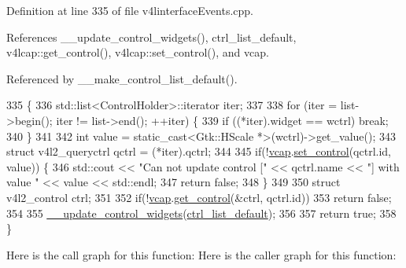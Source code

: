 Definition at line 335 of file v4linterface\+Events.\+cpp.



References \+\_\+\+\_\+update\+\_\+control\+\_\+widgets(), ctrl\+\_\+list\+\_\+default, v4lcap\+::get\+\_\+control(), v4lcap\+::set\+\_\+control(), and vcap.



Referenced by \+\_\+\+\_\+make\+\_\+control\+\_\+list\+\_\+default().


\begin{DoxyCode}
335                                                                                                            
             \{
336         std::list<ControlHolder>::iterator iter;
337 
338         \textcolor{keywordflow}{for} (iter = list->begin(); iter != list->end(); ++iter) \{
339             \textcolor{keywordflow}{if} ((*iter).widget == wctrl) \textcolor{keywordflow}{break};
340         \}
341 
342         \textcolor{keywordtype}{int} value = \textcolor{keyword}{static\_cast<}Gtk::HScale *\textcolor{keyword}{>}(wctrl)->get\_value();
343         \textcolor{keyword}{struct }v4l2\_queryctrl qctrl = (*iter).qctrl;
344 
345         \textcolor{keywordflow}{if}(!\hyperlink{class_v_s_s_s___g_u_i_1_1_v4_l_interface_a7ece61f4ccc6d5321c445e60f34e7f33}{vcap}.\hyperlink{classv4lcap_a863a15d2d66cc0b7367dcc9cba64e0bd}{set\_control}(qctrl.id, value)) \{
346             std::cout << \textcolor{stringliteral}{"Can not update control ["} << qctrl.name << \textcolor{stringliteral}{"] with value "} << value << std::endl;
347             \textcolor{keywordflow}{return} \textcolor{keyword}{false};
348         \}
349 
350         \textcolor{keyword}{struct }v4l2\_control ctrl;
351 
352         \textcolor{keywordflow}{if}(!\hyperlink{class_v_s_s_s___g_u_i_1_1_v4_l_interface_a7ece61f4ccc6d5321c445e60f34e7f33}{vcap}.\hyperlink{classv4lcap_affd6d918400a56e165d7a3e4fab8bdae}{get\_control}(&ctrl, qctrl.id))
353             \textcolor{keywordflow}{return} \textcolor{keyword}{false};
354 
355         \hyperlink{class_v_s_s_s___g_u_i_1_1_v4_l_interface_afbb5daccfdce20180578025c108ef65b}{\_\_update\_control\_widgets}(\hyperlink{class_v_s_s_s___g_u_i_1_1_v4_l_interface_a97faf21f7b67c8ef15ceeafa377c6ea4}{ctrl\_list\_default});
356 
357         \textcolor{keywordflow}{return} \textcolor{keyword}{true};
358     \}
\end{DoxyCode}
Here is the call graph for this function\+:
Here is the caller graph for this function\+:
\mbox{\label{class_v_s_s_s___g_u_i_1_1_v4_l_interface_ac3fe0a20fd30c6e9505eb375ef63e52e}} 
